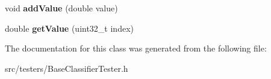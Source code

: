 \begin{DoxyCompactItemize}
\item 
\hypertarget{classffactory_1_1_parameter_set_a38977f735d79efdaa74cb6299423485c}{void {\bfseries add\-Value} (double value)}\label{classffactory_1_1_parameter_set_a38977f735d79efdaa74cb6299423485c}

\item 
\hypertarget{classffactory_1_1_parameter_set_a41cb3c22a42d40a80312bf0f8c3361c6}{double {\bfseries get\-Value} (uint32\-\_\-t index)}\label{classffactory_1_1_parameter_set_a41cb3c22a42d40a80312bf0f8c3361c6}

\end{DoxyCompactItemize}


The documentation for this class was generated from the following file\-:\begin{DoxyCompactItemize}
\item 
src/testers/Base\-Classifier\-Tester.\-h\end{DoxyCompactItemize}
